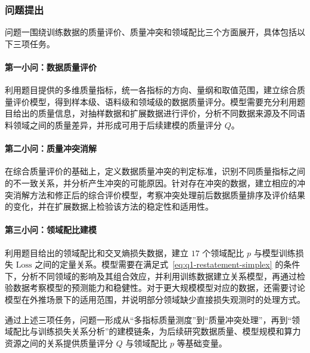 \subsubsection{问题提出}

问题一围绕训练数据的质量评价、质量冲突和领域配比三个方面展开，具体包括以下三项任务。

\paragraph{第一小问：数据质量评价}
利用题目提供的多维质量指标，统一各指标的方向、量纲和取值范围，建立综合质量评价模型，得到样本级、语料级和领域级的数据质量评分。模型需要充分利用题目给出的质量信息，对抽样数据和扩展数据进行评价，分析不同数据来源及不同语料领域之间的质量差异，并形成可用于后续建模的质量评分 $Q$。

\paragraph{第二小问：质量冲突消解}
在综合质量评价的基础上，定义数据质量冲突的判定标准，识别不同质量指标之间的不一致关系，并分析产生冲突的可能原因。针对存在冲突的数据，建立相应的冲突消解方法和修正后的综合评价模型，考察冲突处理前后数据质量排序及评价结果的变化，并在扩展数据上检验该方法的稳定性和适用性。

\paragraph{第三小问：领域配比建模}
利用题目给出的领域配比和交叉熵损失数据，建立 $17$ 个领域配比 $p$ 与模型训练损失 $\mathrm{Loss}$ 之间的定量关系。模型需要在满足式~\eqref{eq:q1-restatement-simplex} 的条件下，分析不同领域的影响及其组合效应，并利用训练数据建立关系模型，再通过检验数据考察模型的预测能力和稳健性。对于更大规模模型对应的数据，还需要讨论模型在外推场景下的适用范围，并说明部分领域缺少直接损失观测时的处理方式。

通过上述三项任务，问题一形成从“多指标质量测度”到“质量冲突处理”，再到“领域配比与训练损失关系分析”的建模链条，为后续研究数据质量、模型规模和算力资源之间的关系提供质量评分 $Q$ 与领域配比 $p$ 等基础变量。
